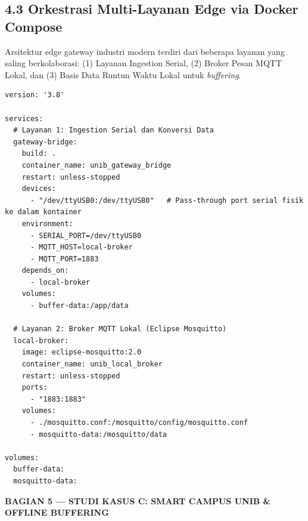 \documentclass[11pt,a4paper]{article}
\newcommand{\secbanner}[2]{%
    \vspace{8pt}%
    \noindent\colorbox{unibnavy}{%
        \parbox{\dimexpr\textwidth-2\fboxsep\relax}{%
            \vspace{4pt}\textbf{\large\color{white}#1 --- #2}\vspace{4pt}%
        }%
    }%
    \vspace{4pt}%
}
\begin{document}
\subsection*{4.3 Orkestrasi Multi-Layanan Edge via Docker Compose}
Arsitektur edge gateway industri modern terdiri dari beberapa layanan yang saling berkolaborasi: (1) Layanan Ingestion Serial, (2) Broker Pesan MQTT Lokal, dan (3) Basis Data Runtun Waktu Lokal untuk \textit{buffering}.

\begin{lstlisting}[style=iotcode, caption={Orkestrasi Multi-Service Gateway (docker-compose.yml)}]
version: '3.8'

services:
  # Layanan 1: Ingestion Serial dan Konversi Data
  gateway-bridge:
    build: .
    container_name: unib_gateway_bridge
    restart: unless-stopped
    devices:
      - "/dev/ttyUSB0:/dev/ttyUSB0"   # Pass-through port serial fisik ke dalam kontainer
    environment:
      - SERIAL_PORT=/dev/ttyUSB0
      - MQTT_HOST=local-broker
      - MQTT_PORT=1883
    depends_on:
      - local-broker
    volumes:
      - buffer-data:/app/data

  # Layanan 2: Broker MQTT Lokal (Eclipse Mosquitto)
  local-broker:
    image: eclipse-mosquitto:2.0
    container_name: unib_local_broker
    restart: unless-stopped
    ports:
      - "1883:1883"
    volumes:
      - ./mosquitto.conf:/mosquitto/config/mosquitto.conf
      - mosquitto-data:/mosquitto/data

volumes:
  buffer-data:
  mosquitto-data:
\end{lstlisting}

\secbanner{BAGIAN 5}{STUDI KASUS C: SMART CAMPUS UNIB \& OFFLINE BUFFERING}
\end{document}
